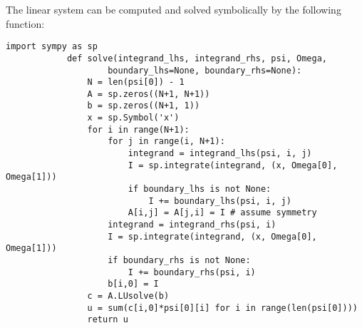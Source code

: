 \documentclass[../main.tex]{subfiles}
\begin{document}
		The linear system can be computed and solved symbolically by the following function:
		\begin{lstlisting}[numbers=none]
			import sympy as sp
			def solve(integrand_lhs, integrand_rhs, psi, Omega,
					boundary_lhs=None, boundary_rhs=None):
				N = len(psi[0]) - 1
				A = sp.zeros((N+1, N+1))
				b = sp.zeros((N+1, 1))
				x = sp.Symbol('x')
				for i in range(N+1):
					for j in range(i, N+1):
						integrand = integrand_lhs(psi, i, j)
						I = sp.integrate(integrand, (x, Omega[0], Omega[1]))
						if boundary_lhs is not None:
							I += boundary_lhs(psi, i, j)
						A[i,j] = A[j,i] = I # assume symmetry
					integrand = integrand_rhs(psi, i)
					I = sp.integrate(integrand, (x, Omega[0], Omega[1]))
					if boundary_rhs is not None:
						I += boundary_rhs(psi, i)
					b[i,0] = I
				c = A.LUsolve(b)
				u = sum(c[i,0]*psi[0][i] for i in range(len(psi[0])))
				return u
		\end{lstlisting}\smallbreak
		
\end{document}

